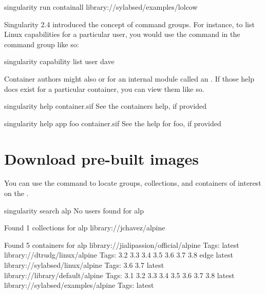 \documentclass[letterpaper,10pt,english]{sphinxmanual}
\begin{document}
%
\begin{sphinxVerbatim}[commandchars=\\\{\}]
\PYGZdl{} singularity run \PYGZhy{}\PYGZhy{}containall library://sylabsed/examples/lolcow
\end{sphinxVerbatim}

Singularity 2.4 introduced the concept of command groups. For instance, to list
Linux capabilities for a particular user, you would use the   command in
the  command group like so:

%
\begin{sphinxVerbatim}[commandchars=\\\{\}]
\PYGZdl{} singularity capability list \PYGZhy{}\PYGZhy{}user dave
\end{sphinxVerbatim}

Container authors might also 
or for an internal module called an . If those help docs exist for a
particular container, you can view them like so.

%
\begin{sphinxVerbatim}[commandchars=\\\{\}]
\PYGZdl{} singularity help container.sif  \PYGZsh{} See the container\PYGZsq{}s help, if provided

\PYGZdl{} singularity help \PYGZhy{}\PYGZhy{}app foo container.sif  \PYGZsh{} See the help for foo, if provided
\end{sphinxVerbatim}


\section{Download pre-built images}
\label{\detokenize{quick_start:download-pre-built-images}}
You can use the  command to locate groups, collections, and
containers of interest on the  .

%
\begin{sphinxVerbatim}[commandchars=\\\{\}]
\PYGZdl{} singularity search alp
No users found for \PYGZsq{}alp\PYGZsq{}

Found 1 collections for \PYGZsq{}alp\PYGZsq{}
    library://jchavez/alpine

Found 5 containers for \PYGZsq{}alp\PYGZsq{}
    library://jialipassion/official/alpine
            Tags: latest
    library://dtrudg/linux/alpine
            Tags: 3.2 3.3 3.4 3.5 3.6 3.7 3.8 edge latest
    library://sylabsed/linux/alpine
            Tags: 3.6 3.7 latest
    library://library/default/alpine
            Tags: 3.1 3.2 3.3 3.4 3.5 3.6 3.7 3.8 latest
    library://sylabsed/examples/alpine
            Tags: latest
\end{sphinxVerbatim}
\end{document}
